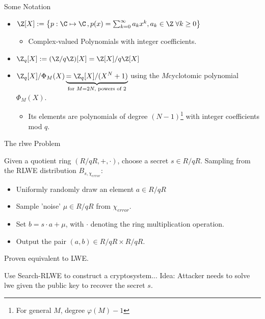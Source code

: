 \begin{frame}{Some Notation}
  \begin{itemize}
    \item $\Z[X] := \big\{p: \C \mapsto \C \,, p(x) = \sum_{k=0}^\infty a_k x^k, a_k \in \Z \;\forall k \geq 0\big\}$
          \begin{itemize}
            \item Complex-valued Polynomials with integer coefficients.
          \end{itemize}
    \item $\Z_q[X] := (\Z/q\Z)[X] = \Z[X] / q\Z[X]$
    \item $\Z_q[X] / \Phi_M(X) \underbrace{ = \Z_q[X]/(X^N+1)}_{\text{for } M=2N, \text{ powers of 2}}$ using the $M$\th cyclotomic polynomial $\Phi_M(X)$.
          \begin{itemize}
            \item Its elements are polynomials of degree $(N-1)$\footnote{For general $M$, degree $\varphi(M) - 1$} with integer coefficients mod $q$.
          \end{itemize}
  \end{itemize}
\end{frame}

\begin{frame}{The \gls{rlwe} Problem}
  \begin{definition}
    Given a quotient ring $(R/qR, +, \cdot)$, choose a secret $s \in R/qR$.
    Sampling from the RLWE distribution $B_{s, \chi_{error}}$:
    \begin{itemize}
      \item Uniformly randomly draw an element $a \in R/qR$
      \item Sample 'noise' $\mu \in R/qR$ from $\chi_{error}$.
      \item Set $b = s \cdot a + \mu$, with $\cdot$ denoting the ring multiplication operation.
      \item Output the pair $(a, b) \in R/qR \times R/qR$.
    \end{itemize}
  \end{definition}

  Proven equivalent to LWE.

  Use Search-RLWE to construct a cryptosystem...
  Idea: Attacker needs to solve \gls{lwe} given the public key to recover the secret $s$.
\end{frame}


